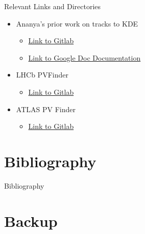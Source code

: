 \documentclass[xcolor=table,aspectratio=169]{beamer}
\makeatletter
\newcommand{\backupbegin}{
    \newcounter{finalframe}
    \setcounter{finalframe}{\value{framenumber}}
    \setbeamertemplate{footline}{} %
    \frame{\usebeamertemplate*{backup page}}
}
\newcommand{\nonumsec}{%
	\addtocontents{toc}{\protect\beamer@sectionintoc{\the\c@section}{\secname}{\the\c@page}{\the\c@part}{0}}%
}
\makeatother
\begin{document}
\begin{frame}{Relevant Links and Directories}
    \begin{itemize}
        \item Ananya's prior work on tracks to KDE
        \begin{itemize}
            \item \href{https://github.com/qibinlei/TracksToKDE/tree/main}{Link to Gitlab}
            \item \href{https://docs.google.com/document/d/1oTlUo06nhkKBF059y9mCXGqZ46PPD3TuHFIe3EkTN-g/edit}{Link to Google Doc Documentation}
        \end{itemize}
        \item LHCb PVFinder
        \begin{itemize}
            \item \href{https://gitlab.cern.ch/sakar/pv-finder_v2/-/tree/master}{Link to Gitlab}
        \end{itemize}
        \item ATLAS PV Finder
        \begin{itemize}
            \item \href{https://gitlab.cern.ch/qlei/atlas_pvfinder}{Link to Gitlab}
        \end{itemize}
    \end{itemize}
\end{frame}

\section{Bibliography}
\begin{frame}[allowframebreaks]{Bibliography}
    \nocite{*}
    \printbibliography
\end{frame}

\section*{Backup}
\nonumsec
\end{document}

